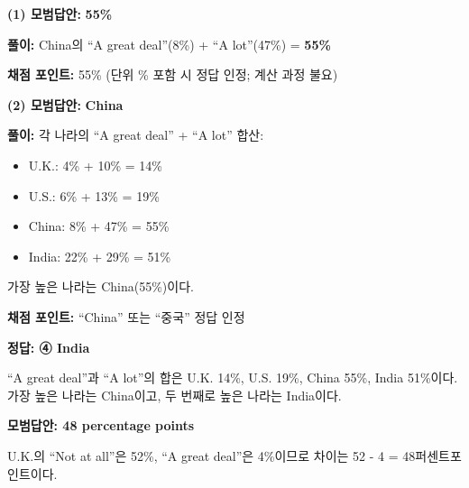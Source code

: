 \documentclass[11pt,a4paper]{article}
\begin{document}
\vspace{12pt}


\vspace{4pt}
\noindent\textbf{(1) 모범답안:} \textbf{55\%}

\noindent\textbf{풀이:} China의 ``A great deal''(8\%) + ``A lot''(47\%) = \textbf{55\%}

\vspace{4pt}
\noindent\textbf{채점 포인트:} 55\% (단위 \% 포함 시 정답 인정; 계산 과정 불요)

\vspace{10pt}

\noindent\textbf{(2) 모범답안:} \textbf{China}

\noindent\textbf{풀이:} 각 나라의 ``A great deal'' + ``A lot'' 합산:
\begin{itemize}[leftmargin=2em,itemsep=1pt,topsep=2pt]
  \item U.K.: 4\% + 10\% = 14\%
  \item U.S.: 6\% + 13\% = 19\%
  \item China: 8\% + 47\% = 55\%
  \item India: 22\% + 29\% = 51\%
\end{itemize}
가장 높은 나라는 China(55\%)이다.

\noindent\textbf{채점 포인트:} ``China'' 또는 ``중국'' 정답 인정

\vspace{10pt}
 \quad \textbf{정답: ④ India}
\par ``A great deal''과 ``A lot''의 합은 U.K. 14\%, U.S. 19\%, China 55\%, India 51\%이다. 가장 높은 나라는 China이고, 두 번째로 높은 나라는 India이다.

\vspace{8pt}
 \quad \textbf{모범답안: 48 percentage points}
\par U.K.의 ``Not at all''은 52\%, ``A great deal''은 4\%이므로 차이는 52 - 4 = 48퍼센트포인트이다.
\end{document}

